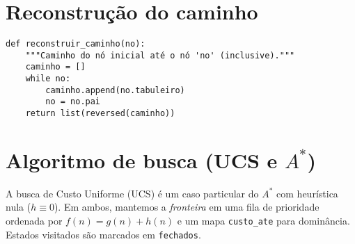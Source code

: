 
\section{Reconstrução do caminho}

\begin{verbatim}
def reconstruir_caminho(no):
    """Caminho do nó inicial até o nó 'no' (inclusive)."""
    caminho = []
    while no:
        caminho.append(no.tabuleiro)
        no = no.pai
    return list(reversed(caminho))
\end{verbatim}


\section{Algoritmo de busca (UCS e \texorpdfstring{$A^*$}{A*})}

A busca de Custo Uniforme (UCS) é um caso particular do $A^*$ com heurística nula ($h \equiv 0$). Em ambos, mantemos a \emph{fronteira} em uma fila de prioridade ordenada por $f(n) = g(n) + h(n)$ e um mapa \texttt{custo\_ate} para dominância. Estados visitados são marcados em \texttt{fechados}.

